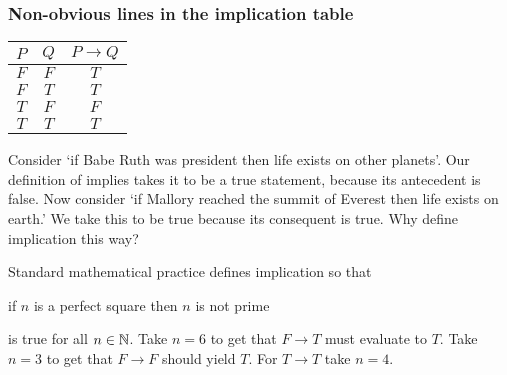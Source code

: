 \documentclass[10pt,t]{beamer}
\begin{document}
\begin{frame}
  \frametitle{Non-obvious lines in the implication table}
\begin{center}
  \begin{tabular}{cc|c}
    $P$  &$Q$  &$P \rightarrow Q$  \\ \hline
    $F$  &$F$  &$T$          \\
    $F$  &$T$  &$T$          \\
    $T$  &$F$  &$F$          \\
    $T$  &$T$  &$T$     
  \end{tabular}
\end{center}
Consider
`if Babe Ruth was president then life exists on other planets'. 
Our definition of implies takes it to be a true statement, 
because its antecedent is false.
\pause 
Now consider 
`if Mallory reached the summit of Everest then life exists on earth.' 
We take this to be true because its consequent is true.
\pause
Why define implication this way?

\pause
Standard mathematical practice defines implication so that
\begin{center}
  if $n$ is a perfect square then $n$ is not prime
\end{center}
is true for all $n\in\mathbb{N}$.
\pause  Take $n=6$ to get that $F\rightarrow T$ must evaluate to $T$.  
\pause Take $n=3$ to get that $F\rightarrow F$ should yield $T$.
\pause For $T\rightarrow T$ take $n=4$.
\end{frame}
\end{document}
